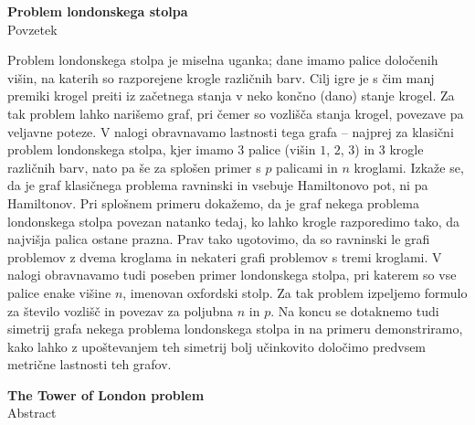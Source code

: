 \documentclass[12pt,a4paper]{amsart}
\begin{document}
\thispagestyle{empty}
\begin{center}
{\bf Problem londonskega stolpa}\\[3mm]
{\sc Povzetek}
\end{center}

Problem londonskega stolpa je miselna uganka; dane imamo palice določenih višin, na katerih so razporejene krogle različnih barv. Cilj igre je s čim manj premiki krogel preiti iz začetnega stanja v neko končno (dano) stanje krogel. Za tak problem lahko narišemo graf, pri čemer so vozlišča stanja krogel, povezave pa veljavne poteze. V nalogi obravnavamo lastnosti tega grafa -- najprej za klasični problem londonskega stolpa, kjer imamo $3$ palice (višin $1$, $2$, $3$) in 3 krogle različnih barv, nato pa še za splošen primer s $p$ palicami in $n$ kroglami. Izkaže se, da je graf klasičnega problema ravninski in vsebuje Hamiltonovo pot, ni pa Hamiltonov. Pri splošnem primeru dokažemo, da je graf nekega problema londonskega stolpa povezan natanko tedaj, ko lahko krogle razporedimo tako, da najvišja palica ostane prazna. Prav tako ugotovimo, da so ravninski le grafi problemov z dvema kroglama in nekateri grafi problemov s tremi kroglami. V nalogi obravnavamo tudi poseben primer londonskega stolpa, pri katerem so vse palice enake višine $n$, imenovan oxfordski stolp. Za tak problem izpeljemo formulo za število vozlišč in povezav za poljubna $n$ in $p$. Na koncu se dotaknemo tudi simetrij grafa nekega problema londonskega stolpa in na primeru demonstriramo, kako lahko z upoštevanjem teh simetrij bolj učinkovito določimo predvsem metrične lastnosti teh grafov.
\vfill
\begin{center}
{\bf The Tower of London problem}\\[3mm]
{\sc Abstract}
\end{center}
\end{document}
